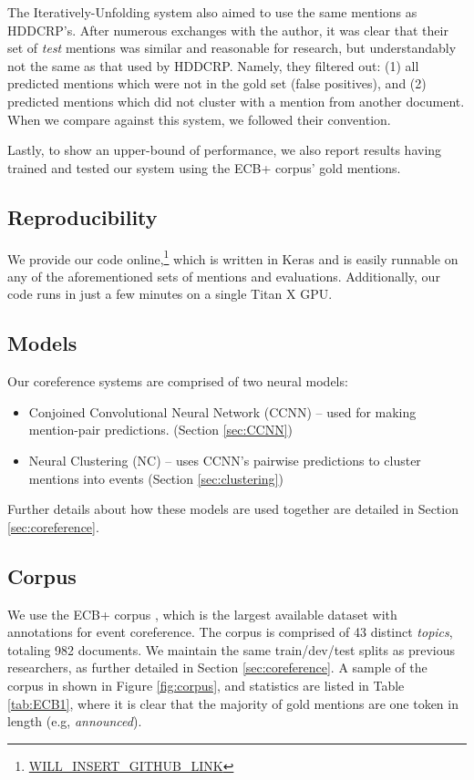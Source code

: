 \documentclass[11pt,a4paper]{article}
\begin{document}
The Iteratively-Unfolding system also aimed to use the same mentions as HDDCRP's.  After numerous exchanges with the author, it was clear that their set of \textit{test} mentions was similar and reasonable for research, but understandably not the same as that used by HDDCRP.  Namely, they filtered out: (1) all predicted mentions which were not in the gold set (false positives), and (2) predicted mentions which did not cluster with a mention from another document.  When we compare against this system, we followed their convention.

Lastly, to show an upper-bound of performance, we also report results having trained and tested our system using the ECB+ corpus' gold mentions.

\subsection{Reproducibility}
We provide our code online,\footnote{\url{WILL_INSERT_GITHUB_LINK}} which is written in Keras \cite{chollet2015} and is easily runnable on any of the aforementioned sets of mentions and evaluations.  Additionally, our code runs in just a few minutes on a single Titan X GPU.

\subsection{Models}
Our coreference systems are comprised of two neural models:
\begin{itemize}
  \item Conjoined Convolutional Neural Network (CCNN) -- used for making mention-pair predictions.  (Section \ref{sec:CCNN})
  \item Neural Clustering (NC) -- uses CCNN's pairwise predictions to cluster mentions into events (Section \ref{sec:clustering})
\end{itemize}

Further details about how these models are used together are detailed in Section \ref{sec:coreference}.

\subsection{Corpus}
\label{sec:corpus}
We use the ECB+ corpus \cite{ECB+}, which is the largest available dataset with annotations for event coreference.  The corpus is comprised of 43 distinct \textit{topics}, totaling 982 documents.  We maintain the same train/dev/test splits as previous researchers, as further detailed in Section \ref{sec:coreference}.  A sample of the corpus in shown in Figure \ref{fig:corpus}, and statistics are listed in Table \ref{tab:ECB1}, where it is clear that the majority of gold mentions are one token in length (e.g, \textit{announced}).
\end{document}
